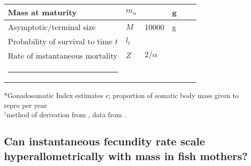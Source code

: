 \documentclass[a4paper]{article} %
\makeatletter
\newcommand{\thickhline}{%
    \noalign {\ifnum 0=`}\fi \hrule height 1pt
    \futurelet \reserved@a \@xhline
}
\makeatother
\begin{document}
\begin{table}[h]
\begin{tabularx}{\linewidth}{Xlllll}
    Mass at maturity                                        & $m_{\alpha}$          &                           & g                     &                                   &                       \\ \hline
    Asymptotic/terminal size                                & $M$                   & 10000              & g                     &                                   &                       \\ \hline
    Probability of survival to time $t$                     & $l_t$                 &                           & \textsc{}             &                                   &                       \\ \hline
    Rate of instantaneous mortality                         & $Z$                   & $2/\alpha$                &                       &                                   &                       \\ \thickhline
    \end{tabularx}
    \label{parameters}
\end{table}
*Gonadosomatic Index estimates $c$; proportion of somatic body mass given to repro per year\\
$^{\dagger}$method of derivation from \textcite{West2001}, data from \textcite{Cummins1971, Steimle1980}.
\subsection{Can instantaneous fecundity rate scale hyperallometrically with mass in fish mothers?}
\end{document}
